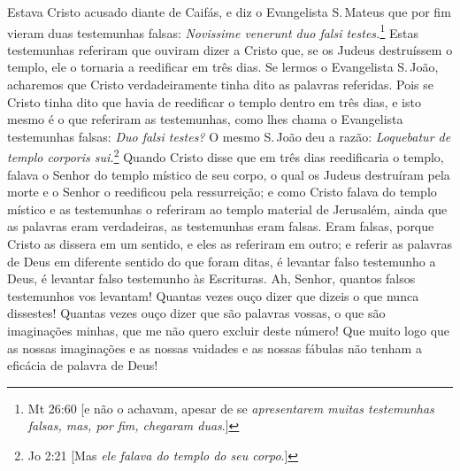 Estava Cristo acusado diante de Caifás, e diz o Evangelista S.\,Mateus que por fim vieram duas testemunhas falsas: \emph{Novissime
venerunt duo falsi testes.}\footnote{Mt 26:60 [e não o achavam, apesar de se \emph{apresentarem muitas testemunhas falsas, mas, por fim, chegaram duas}.]} Estas testemunhas referiram que ouviram
dizer a Cristo que, se os Judeus destruíssem o templo, ele o tornaria a
reedificar em três dias. Se lermos o Evangelista S.\,João, acharemos que
Cristo verdadeiramente tinha dito as palavras referidas. Pois se
Cristo tinha dito que havia de reedificar o templo dentro em três dias,
e isto mesmo é o que referiram as testemunhas, como lhes chama o
Evangelista testemunhas falsas: \emph{Duo falsi testes?} O mesmo S.\,João deu a razão: \emph{Loquebatur de templo corporis sui.}\footnote{Jo 2:21 [Mas \emph{ele falava do templo do seu corpo}.]} Quando
Cristo disse que em três dias reedificaria o templo, falava o Senhor do templo místico de seu corpo, o qual
os Judeus destruíram pela morte e o Senhor o reedificou pela
ressurreição; e como Cristo falava do templo místico e as testemunhas
o referiram ao templo material de Jerusalém, ainda que as palavras eram
verdadeiras, as testemunhas eram falsas. Eram falsas, porque Cristo as
dissera em um sentido, e eles as referiram em outro; e referir as
palavras de Deus em diferente sentido do que foram ditas, é levantar
falso testemunho a Deus, é levantar falso testemunho às Escrituras. Ah,
Senhor, quantos falsos testemunhos vos levantam! Quantas vezes ouço
dizer que dizeis o que nunca dissestes! Quantas vezes ouço dizer que são
palavras vossas, o que são imaginações minhas, que me não quero excluir
deste número! Que muito logo que as nossas imaginações e as nossas
vaidades e as nossas fábulas não tenham a eficácia de palavra de Deus!

